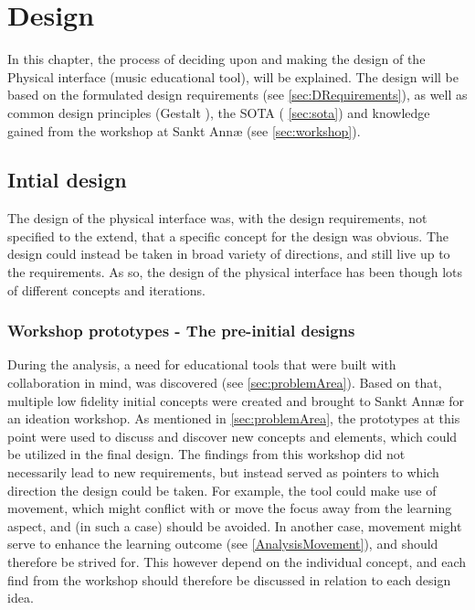 \chapter{Design}

In this chapter, the process of deciding upon and making the design of the Physical interface (music educational tool), will be explained. The design will be based on the formulated design requirements (see \autoref{sec:DRequirements}), as well as common design principles (Gestalt \cite{gestalt}), the SOTA ( \autoref{sec:sota}) and knowledge gained from the workshop at Sankt Annæ (see \autoref{sec:workshop}). 


\section{Intial design}
The design of the physical interface was, with the design requirements, not specified to the extend, that a specific concept for the design was obvious. The design could instead be taken in broad variety of directions, and still live up to the requirements. As so, the design of the physical interface has been though lots of different concepts and iterations. 

\subsection {Workshop prototypes - The pre-initial designs}
During the analysis, a need for educational tools that were built with collaboration in mind, was discovered (see \autoref{sec:problemArea}). Based on that, multiple low fidelity initial concepts were created and brought to Sankt Annæ for an ideation workshop. As mentioned in \autoref{sec:problemArea}, the prototypes at this point were used to discuss and discover new concepts and elements, which could be utilized in the final design. The findings from this workshop did not necessarily lead to new requirements, but instead served as pointers to which direction the design could be taken. For example, the tool could make use of movement, which might conflict with or move the focus away from the learning aspect, and (in such a case) should be avoided. In another case, movement might serve to enhance the learning outcome (see \autoref{AnalysisMovement}), and should therefore be strived for. This however depend on the individual concept, and each find from the workshop should therefore be discussed in relation to each design idea. 
\\\\


